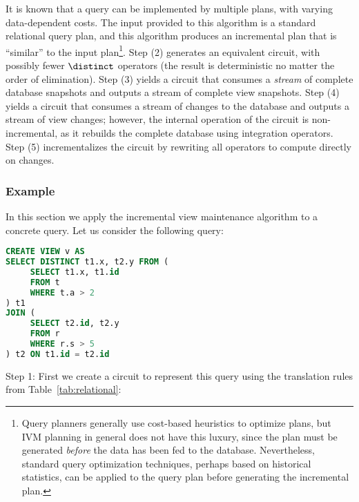 It is known that a query can be implemented by multiple plans, with
varying data-dependent costs.  The input provided to this algorithm is
a standard relational query plan, and this algorithm produces an
incremental plan that is ``similar'' to the input plan\footnote{Query
  planners generally use cost-based heuristics to optimize plans, but
  IVM planning in general does not have this luxury, since the plan
  must be generated \emph{before} the data has been fed to the
  database.  Nevertheless, standard query optimization techniques,
  perhaps based on historical statistics, can be applied to the query
  plan before generating the incremental plan.}.  Step (2) generates
an equivalent circuit, with possibly fewer $\distinct$ operators (the
result is deterministic no matter the order of elimination).  Step (3)
yields a circuit that consumes a \emph{stream} of complete database
snapshots and outputs a stream of complete view snapshots. Step (4)
yields a circuit that consumes a stream of changes to the database and
outputs a stream of view changes; however, the internal operation of
the circuit is non-incremental, as it rebuilds the complete database
using integration operators.  Step (5) incrementalizes the circuit by
rewriting all operators to compute directly on changes.

\subsubsection{Example}

In this section we apply the incremental view maintenance algorithm to a concrete
query.  Let us consider the following query:

\begin{lstlisting}[language=SQL]
CREATE VIEW v AS
SELECT DISTINCT t1.x, t2.y FROM (
     SELECT t1.x, t1.id
     FROM t
     WHERE t.a > 2
) t1
JOIN (
     SELECT t2.id, t2.y
     FROM r
     WHERE r.s > 5
) t2 ON t1.id = t2.id
\end{lstlisting}

Step 1: First we create a \dbsp circuit to represent this query using the
translation rules from Table~\ref{tab:relational}:

